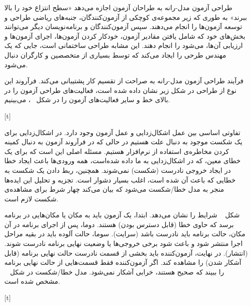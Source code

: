 طراحی آزمون مدل-رانه به طراحان آزمون اجازه می‌‌دهد «سطح انتزاع خود را بالا ببرند» به طوری که زیر مجموعه‌ی کوچکی از آزمون‌کنندگان، جنبه‌های ریاضی طراحی و توسعه آزمون‌ها را انجام می‌دهند. سپس آزمون‌کنندگان و برنامه‌نویسان دیگر می‌توانند بخش‌های خود که شامل یافتن مقادیر آزمون، خودکار کردن آزمون‌ها، اجرای آزمون‌ها و ارزیابی آن‌ها، می‌شود را انجام ‌دهند. این مشابه طراحی ساختمانی است، جایی که یک مهندس طرحی را ایجاد می‌‌کند که توسط بسیاری از متخصصین و کارگران دنبال می‌شود. 

فرآیند طراحی آزمون مدل-رانه به صراحت از تقسیم کار پشتیبانی می‌‌کند. فرآروند این نوع از طراحی در شکل زیر نشان داده شده است، فعالیت‌های طراحی آزمون را در بالای خط و سایر فعالیت‌های آزمون را در شکل ~، می‌بینیم.

[t]
\vspace{0.5em}



تفاوتی اساسی بین عمل اشکال‌زدایی و عمل آزمون وجود دارد. در اشکال‌زدایی برای یک شکست موجود به دنبال علت هستیم در حالی که در فرآروند آزمون به دنبال کمینه کردن مخاطره‌ی استفاده از نرم‌افزار هستیم. مسئله اصلی این است که برای یک خطای معین، که در اشکال‌زدایی به ما داده شده‌است، همه ورودی‌ها باعث ایجاد خطا در ایجاد خروجی نادرست (شکست) نمی‌‌شوند. همچنین، ربط دادن یک شکست به خطایی که باعث آن شده است، اغلب بسیار دشوار است. تجزیه و تحلیل این ایده‌ها منجر به مدل خطا/شکست می‌شود که بیان می‌‌کند چهار شرط برای مشاهده‌ی شکست لازم است.

شکل ‍~ شرایط را نشان می‌‌دهد. ابتدا، یک آزمون باید به مکان یا مکان‌هایی در برنامه برسد که حاوی خطا (قابل دسترس بودن) هستند. دوما، پس از اجرای برنامه در آن مکان، حالت برنامه باید نادرست باشد (سرایت). سوما، حالت آلوده باید در بقیه مراحل اجرا منتشر شود و باعث شود برخی خروجی‌ها یا وضعیت نهایی برنامه نادرست شوند.(انتشار). در نهایت، آزمون‌کننده باید بخشی از قسمت نادرست حالت نهایی برنامه (قابل آشکار شدن) را مشاهده کند. اگر آزمون‌کننده فقط قسمت‌هایی از حالت نهایی برنامه را ببیند که صحیح هستند، خرابی آشکار نمی‌شود. مدل خطا/شکست در شکل ~ مشخص شده است.

[t]
\vspace{0.5em}


